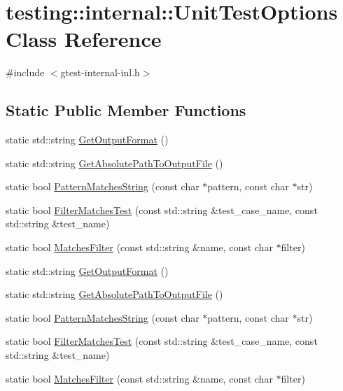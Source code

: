 \hypertarget{classtesting_1_1internal_1_1_unit_test_options}{\section{testing\-:\-:internal\-:\-:Unit\-Test\-Options Class Reference}
\label{classtesting_1_1internal_1_1_unit_test_options}
}


{\ttfamily \#include $<$gtest-\/internal-\/inl.\-h$>$}

\subsection*{Static Public Member Functions}
\begin{DoxyCompactItemize}
\item 
static std\-::string \hyperlink{classtesting_1_1internal_1_1_unit_test_options_ae7413a21296d885c6924650b51ac4f6d}{Get\-Output\-Format} ()
\item 
static std\-::string \hyperlink{classtesting_1_1internal_1_1_unit_test_options_a993fb30ad66104158c8c0ac508daca3f}{Get\-Absolute\-Path\-To\-Output\-File} ()
\item 
static bool \hyperlink{classtesting_1_1internal_1_1_unit_test_options_af0235a2ee26dd6db21305e11d2358e4f}{Pattern\-Matches\-String} (const char $\ast$pattern, const char $\ast$str)
\item 
static bool \hyperlink{classtesting_1_1internal_1_1_unit_test_options_a9975b59cece94874b303421697e3bca6}{Filter\-Matches\-Test} (const std\-::string \&test\-\_\-case\-\_\-name, const std\-::string \&test\-\_\-name)
\item 
static bool \hyperlink{classtesting_1_1internal_1_1_unit_test_options_a67fc0adaffbb8d320b92e42e05017e4e}{Matches\-Filter} (const std\-::string \&name, const char $\ast$filter)
\item 
static std\-::string \hyperlink{classtesting_1_1internal_1_1_unit_test_options_ad65cb6f5a13a146a93490e12cf6d8570}{Get\-Output\-Format} ()
\item 
static std\-::string \hyperlink{classtesting_1_1internal_1_1_unit_test_options_a8b29c6a22fd2f904c6b0453e403f58fa}{Get\-Absolute\-Path\-To\-Output\-File} ()
\item 
static bool \hyperlink{classtesting_1_1internal_1_1_unit_test_options_a9b6907c74fa654aba4888bf6043e1cad}{Pattern\-Matches\-String} (const char $\ast$pattern, const char $\ast$str)
\item 
static bool \hyperlink{classtesting_1_1internal_1_1_unit_test_options_a3e8303523dda985b46c3246ee15cda42}{Filter\-Matches\-Test} (const std\-::string \&test\-\_\-case\-\_\-name, const std\-::string \&test\-\_\-name)
\item 
static bool \hyperlink{classtesting_1_1internal_1_1_unit_test_options_a440fa46f4ee0e564d7cc382e1171f496}{Matches\-Filter} (const std\-::string \&name, const char $\ast$filter)
\end{DoxyCompactItemize}


